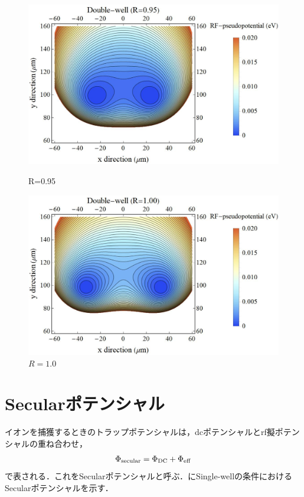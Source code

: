 \begin{figure}[h]
	\begin{minipage}{0.48\linewidth}
		\begin{center}
			\includegraphics[width = 0.9\columnwidth]{./simulation/figure/rf_pseudopotential_R=095.jpg}
			\caption{R=0.95}
			\label{fig:R095}
		\end{center}
	\end{minipage}
	\begin{minipage}{0.48\linewidth}
			\begin{center}
				\includegraphics[width = 0.9\columnwidth]{./simulation/figure/rf_pseudopotential_R=100.jpg}
				\caption{$R=1.0$}
				\label{fig:R100}
			\end{center}
		\end{minipage}
\end{figure}

\clearpage

\section{Secularポテンシャル}
イオンを捕獲するときのトラップポテンシャルは，dcポテンシャルとrf擬ポテンシャルの重ね合わせ，
\large
\begin{align}
	\Phi_{\rm secular} = \Phi_{\rm DC} + \Phi_{\rm eff}
\end{align}
\normalsize
で表される．これをSecularポテンシャルと呼ぶ．にSingle-wellの条件におけるSecularポテンシャルを示す．

